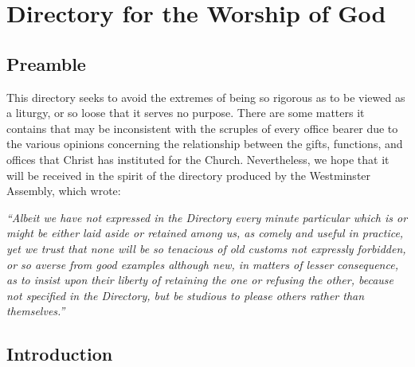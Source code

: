\chapter{Directory for the Worship of God}

\section{Preamble}
This directory seeks to avoid the extremes of being so rigorous as to be
viewed as a liturgy, or so loose that it serves no purpose. There are some matters it contains that may be
inconsistent with the
scruples of every office bearer due to the various opinions concerning the relationship between the gifts, functions, and offices that
Christ has instituted for the Church. Nevertheless, we hope that it will be received in the spirit of the directory
produced by the Westminster Assembly, which wrote:

\textit{{}``Albeit we have not expressed in the Directory every minute particular which is or might be either laid aside
or retained among us, as comely and useful in practice, yet we trust that none will be so tenacious of old customs not
expressly forbidden, or so averse from good examples although new, in matters of
lesser}\textit{ consequence, as to insist upon their
liberty}\textit{ of retaining the one or refusing the other,
because not specified in the Directory, but be studious to please others rather than themselves.'' }


\section{Introduction}

